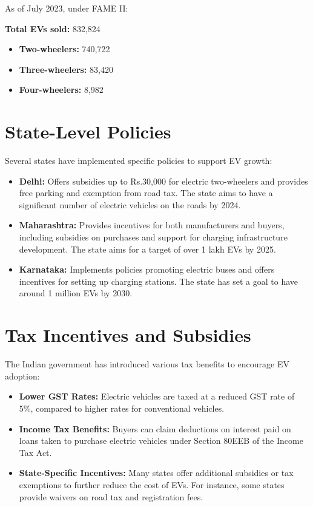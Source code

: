 \documentclass[a4paper,12pt]{report}
\begin{document}
As of July 2023, under FAME II:

\textbf{Total EVs sold:} 832,824
\begin{itemize}
    \item \textbf{Two-wheelers:} 740,722
    \item \textbf{Three-wheelers:} 83,420
    \item \textbf{Four-wheelers:} 8,982
\end{itemize}

\section{State-Level Policies}
Several states have implemented specific policies to support EV growth:
\begin{itemize}
    \item \textbf{Delhi: }
    Offers subsidies up to Rs.30,000 for electric two-wheelers and provides free parking and exemption from road tax. The state aims to have a significant number of electric vehicles on the roads by 2024.
    
    \item \textbf{Maharashtra: }
    Provides incentives for both manufacturers and buyers, including subsidies on purchases and support for charging infrastructure development. The state aims for a target of over 1 lakh EVs by 2025.
    
    \item \textbf{Karnataka: }
    Implements policies promoting electric buses and offers incentives for setting up charging stations. The state has set a goal to have around 1 million EVs by 2030.

\end{itemize}


\section{Tax Incentives and Subsidies}
The Indian government has introduced various tax benefits to encourage EV adoption:
\begin{itemize}
    \item \textbf{Lower GST Rates: }
    Electric vehicles are taxed at a reduced GST rate of 5\%, compared to higher rates for conventional vehicles.

    \item \textbf{Income Tax Benefits: }
    Buyers can claim deductions on interest paid on loans taken to purchase electric vehicles under Section 80EEB of the Income Tax Act.\cite{80eeb}

    \item \textbf{State-Specific Incentives: }
    Many states offer additional subsidies or tax exemptions to further reduce the cost of EVs. For instance, some states provide waivers on road tax and registration fees.
    
\end{itemize}
\end{document}

